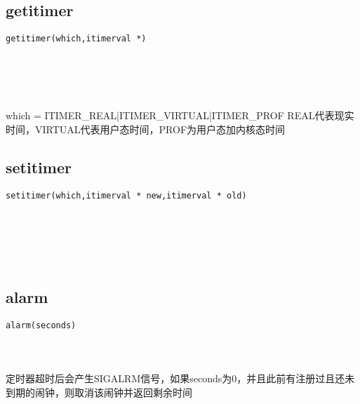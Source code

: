 \documentclass[10pt,a4paper]{article}
\begin{document}
\subsection{getitimer}
\begin{spacing}{2.0}
\lstset{language=C,numbers=none}
\begin{lstlisting}
getitimer(which,itimerval *)
\end{lstlisting}
{\large\color[rgb]{0.2,0.4,0.6}{which:}} \\
{\large\color[rgb]{0.2,0.4,0.6}{*:}}
\paragraph{ \ \ }which = ITIMER\_REAL|ITIMER\_VIRTUAL|ITIMER\_PROF REAL代表现实时间，VIRTUAL代表用户态时间，PROF为用户态加内核态时间
\end{spacing}

\subsection{setitimer}
\begin{spacing}{2.0}
\lstset{language=C,numbers=none}
\begin{lstlisting}
setitimer(which,itimerval * new,itimerval * old)
\end{lstlisting}
{\large\color[rgb]{0.2,0.4,0.6}{which:}} \\
{\large\color[rgb]{0.2,0.4,0.6}{new:}} \\
{\large\color[rgb]{0.2,0.4,0.6}{old:}}
\paragraph{ \ \ }
\end{spacing}

\subsection{alarm}
\begin{spacing}{2.0}
\lstset{language=C,numbers=none}
\begin{lstlisting}
alarm(seconds)
\end{lstlisting}
{\large\color[rgb]{0.2,0.4,0.6}{seconds:}}
\paragraph{ \ \ }定时器超时后会产生SIGALRM信号，如果seconds为0，并且此前有注册过且还未到期的闹钟，则取消该闹钟并返回剩余时间
\end{spacing}
\end{document}
